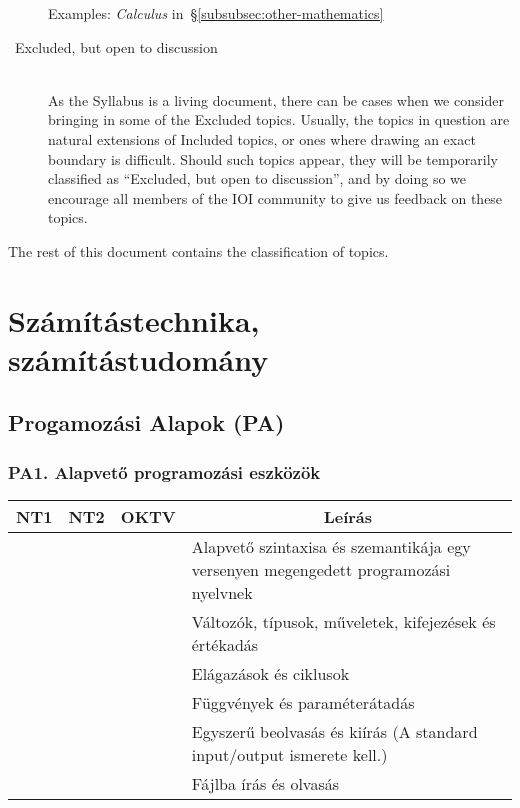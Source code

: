 \documentclass[a4paper,11pt,oneside]{article}
\newcommand{\cmark}{\ding{51}}%
\newcommand{\xmark}{\ding{55}}%
\newcommand{\cincl}{{\small\cmark}}
\newcommand{\cemay}{{\small\xmark\faQuestionCircle}}
\newcommand{\ctable}[1]{
    \begin{center}
        \begin{tabular}{ | C | C | C | m{8cm} | }
        \hline
        \textbf{NT1} & \textbf{NT2} & \textbf{OKTV} & \multicolumn{1}{|c|}{\textbf{Leírás}} \\ \hline
        #1
        \end{tabular}
    \end{center}    
}
\begin{document}
\begin{description}
    Examples: \emph{Calculus\/} in~\S\ref{subsubsec:other-mathematics}

\item[\cemay\ Excluded, but open to discussion]~\\
    As the Syllabus is a living document, there can be cases when we consider
    bringing in some of the Excluded topics. Usually, the topics in question
    are natural extensions of Included topics, or ones where drawing an exact
    boundary is difficult. Should such topics appear, they will be temporarily
    classified as ``Excluded, but open to discussion'', and by doing so we encourage 
    all members of the IOI community to give us feedback on these topics.
\end{description}

\bigskip

\noindent
The rest of this document contains the classification of topics.


\section {Számítástechnika, számítástudomány} %
\label{subsec:computing-science}

\subsection {Progamozási Alapok (PA)} %
\label{subsubsec:PF}

    \subsubsection*{PA1. Alapvető programozási eszközök} %

    \ctable {
        \cincl & \cincl & \cincl &
        Alapvető szintaxisa és szemantikája egy versenyen megengedett programozási nyelvnek 
        \\ \hline
        
        \cincl & \cincl & \cincl &
        Változók, típusok, műveletek, kifejezések és értékadás
        \\ \hline
        
        \cincl & \cincl & \cincl &
        Elágazások és ciklusok
        \\ \hline
        
        \cincl & \cincl & \cincl &
        Függvények és paraméterátadás 
        \\ \hline
        
        \cincl & \cincl & \cincl &
        Egyszerű beolvasás és kiírás (A standard input/output ismerete kell.) 
        \\ \hline
        
        \cemay & \cemay & \cemay &
        Fájlba írás és olvasás
        \\ \hline
    }
\end{document}
